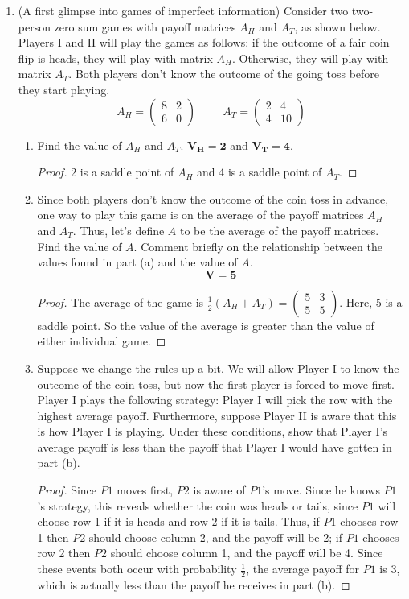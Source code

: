 \documentclass[10pt]{article}
\begin{document}
\begin{enumerate}
\item (A first glimpse into games of imperfect information) Consider two two-person zero sum games with payoff matrices $A_H$ and $A_T$, as shown below.  Players I and II will play the games as follows: if the outcome of a fair coin flip is heads, they will play with matrix $A_H$.  Otherwise, they will play with matrix $A_T$.  Both players don't know the outcome of the going toss before they start playing.
$$
A_H = \begin{pmatrix}
8 & 2 \\
6 & 0
\end{pmatrix}
\hspace{1cm}
A_T = \begin{pmatrix}
2 & 4 \\
4 & 10
\end{pmatrix}
$$
\begin{enumerate}
\item Find the value of $A_H$ and $A_T$.
\hspace{1cm} $\mathbf{V_H = 2}$ and $\mathbf{V_T = 4}$.
\begin{proof}
2 is a saddle point of $A_H$ and 4 is a saddle point of $A_T$.
\end{proof}
\item Since both players don't know the outcome of the coin toss in advance, one way to play this game is on the average of the payoff matrices $A_H$ and $A_T$. Thus, let's define $A$ to be the average of the payoff matrices. Find the value of $A$. Comment briefly on the relationship between the values found in part (a) and the value of $A$.
$$\mathbf{V = 5}$$
\begin{proof}
The average of the game is $\frac{1}{2}(A_H + A_T) = 
\begin{pmatrix}
5 & 3 \\
5 & 5
\end{pmatrix}$.  Here, 5 is a saddle point.  So the value of the average is greater than the value of either individual game.
\end{proof}
\item Suppose we change the rules up a bit. We will allow Player I to know the outcome of the coin toss, but now the first player is forced to move first. Player I plays the following strategy: Player I will pick the row with the highest average payoff. Furthermore, suppose Player II is aware that this is how Player I is playing. Under these conditions, show that Player I's average payoff is less than the payoff that Player I would have gotten in part (b).
\begin{proof}
Since $P1$ moves first, $P2$ is aware of $P1$'s move.  Since he knows $P1$'s strategy, this reveals whether the coin was heads or tails, since $P1$ will choose row 1 if it is heads and row 2 if it is tails.  Thus, if $P1$ chooses row 1 then $P2$ should choose column 2, and the payoff will be 2; if $P1$ chooses row 2 then $P2$ should choose column 1, and the payoff will be 4.  Since these events both occur with probability $\frac12$, the average payoff for $P1$ is $3$, which is actually less than the payoff he receives in part (b).
\end{proof}
\end{enumerate}


\end{enumerate}
\end{document}
